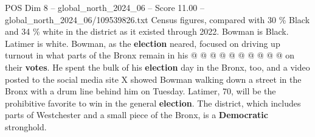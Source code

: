 \begin{textsample}{POS Dim 8 – global\_north\_2024\_06 – Score 11.00 – global\_north\_2024\_06/109539826.txt}
Census figures, compared with 30 \% Black and 34 \% white in the district as it existed through 2022.
Bowman is Black.
Latimer is white.
Bowman, as the \textbf{election} neared, focused on driving up turnout in what parts of the Bronx remain in his @ @ @ @ @ @ @ @ @ @ on their \textbf{votes}.
He spent the bulk of his \textbf{election} day in the Bronx, too, and a video posted to the social media site X showed Bowman walking down a street in the Bronx with a drum line behind him on Tuesday.
Latimer, 70, will be the prohibitive favorite to win in the general \textbf{election}.
The district, which includes parts of Westchester and a small piece of the Bronx, is a \textbf{Democratic} stronghold.

\end{textsample}
